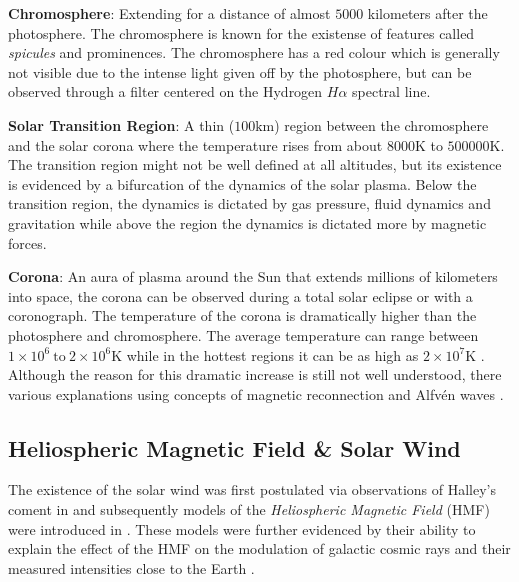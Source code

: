 

\textbf{Chromosphere}: Extending for a distance of almost $5000$ kilometers after the photosphere. The chromosphere is 
known for the existense of features called \emph{spicules} and prominences. The chromosphere has a red colour which 
is generally not visible due to the intense light given off by the photosphere, but can be observed through 
a filter centered on the Hydrogen $H\alpha$ spectral line. %

\textbf{Solar Transition Region}: A thin ($100 \text{km}$) region between the chromosphere and the solar corona 
where the temperature rises from about $8000 \text{K}$ to $500000 \text{K}$. The transition region might not be well 
defined at all altitudes, but its existence is evidenced by a bifurcation of the dynamics of the solar plasma. 
Below the transition region, the dynamics is dictated by gas pressure, fluid dynamics and gravitation while 
above the region the dynamics is dictated more by magnetic forces.

\textbf{Corona}: An aura of plasma around the Sun that extends millions of kilometers into space, the corona can be 
observed during a total solar eclipse or with a coronograph. The temperature of the corona is dramatically higher 
than the photosphere and chromosphere. The average temperature can range between 
$1 \times 10^6 \ \text{to} \ 2 \times 10^6 \text{K}$ while in the hottest regions it can be as high as 
$2 \times 10^7 \text{K}$ \citep{SolarCorona}. Although the reason for this dramatic increase is still 
not well understood, there various explanations using concepts of magnetic reconnection 
\citep{russell2001solar,SolarCorona} and Alfv\'en waves \citep{AlfvenCorona}.


\subsection{Heliospheric Magnetic Field \& Solar Wind}

The existence of the solar wind was first postulated via observations of Halley's coment in 
\citet{Bierman1,Bierman2,Bierman3} and subsequently models of the \emph{Heliospheric Magnetic Field} (HMF) 
were introduced in \citet{parker1958dynamics}. These models were further evidenced by their ability 
to explain the effect of the HMF on the modulation of galactic cosmic rays and their measured intensities 
close to the Earth \citep{ParkerSolarWind}. 

